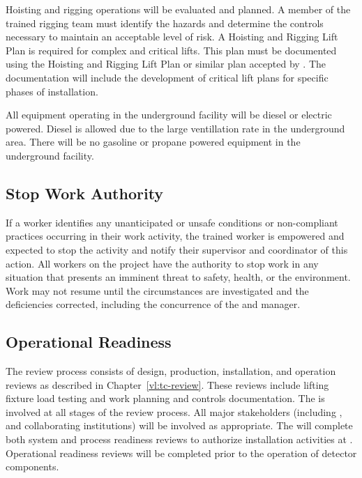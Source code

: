 Hoisting and rigging operations will be evaluated and planned.  A
member of the trained rigging team must identify the hazards and
determine the controls necessary to maintain an acceptable level of
risk.  A Hoisting and Rigging Lift Plan is required for complex and
critical lifts. This plan must be documented using the \fnal Hoisting
and Rigging Lift Plan or similar plan accepted by \fnal. The 
 documentation will include the development of critical lift
plans for specific phases of installation. %

All equipment operating in the underground facility will be diesel or
electric powered. Diesel is allowed due to the large
ventillation rate in the underground area.  There will be no gasoline or propane powered
equipment in the underground facility.

\subsection{Stop Work Authority}

If a worker identifies any unanticipated or unsafe conditions %
or non-compliant
practices occurring in their work activity, %
the trained worker is empowered and expected to stop the activity
 and notify their supervisor and   coordinator of
this action. All workers on the  project have the
authority to stop work in any situation that presents an imminent
threat to safety, health, or the environment. Work may not resume
until the circumstances are investigated and the deficiencies corrected,
including the concurrence of the  
and   manager.


\subsection{Operational Readiness}

The  review process consists of design, production,
installation, and operation reviews as described in
Chapter~\ref{vl:tc-review}. These reviews include lifting fixture
load testing and work planning and controls documentation. The
   is involved at all stages of the review
process. All major stakeholders (including ,  and
 collaborating institutions) will be involved as
appropriate. The   will complete both system and process
readiness reviews to authorize installation activities at
.  Operational readiness reviews will be completed prior
 to the operation of detector components.

